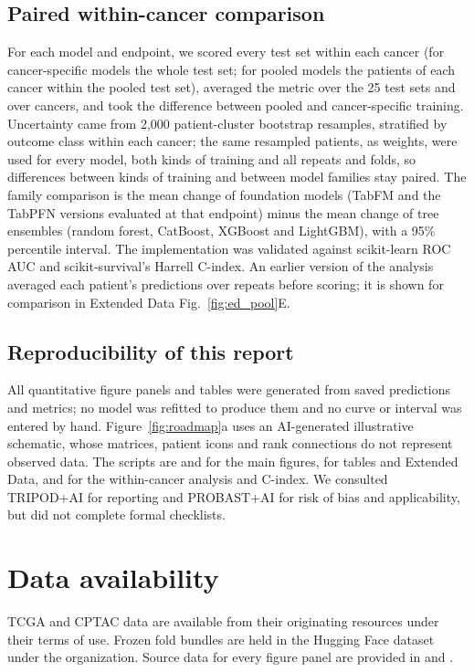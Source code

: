 \documentclass[11pt, a4paper, onecolumn, confidential, copyright]{hawkfranklin}
\begin{document}
\subsection*{Paired within-cancer comparison}
For each model and endpoint, we scored every test set within each cancer (for cancer-specific models the whole test set; for pooled models the patients of each cancer within the pooled test set), averaged the metric over the 25 test sets and over cancers, and took the difference between pooled and cancer-specific training. Uncertainty came from 2,000 patient-cluster bootstrap resamples, stratified by outcome class within each cancer; the same resampled patients, as weights, were used for every model, both kinds of training and all repeats and folds, so differences between kinds of training and between model families stay paired. The family comparison is the mean change of foundation models (TabFM and the TabPFN versions evaluated at that endpoint) minus the mean change of tree ensembles (random forest, CatBoost, XGBoost and LightGBM), with a 95\% percentile interval. The implementation was validated against scikit-learn ROC AUC and scikit-survival's Harrell C-index. An earlier version of the analysis averaged each patient's predictions over repeats before scoring; it is shown for comparison in Extended Data Fig.~\ref{fig:ed_pool}E.

\subsection*{Reproducibility of this report}
All quantitative figure panels and tables were generated from saved predictions and metrics; no model was refitted to produce them and no curve or interval was entered by hand. Figure~\ref{fig:roadmap}a uses an AI-generated illustrative schematic, whose matrices, patient icons and rank connections do not represent observed data. The scripts are  and  for the main figures,  for tables and Extended Data, and  for the within-cancer analysis and C-index. We consulted TRIPOD+AI for reporting and PROBAST+AI for risk of bias and applicability, but did not complete formal checklists.\citep{tripodai2024,probastai2024}

\section*{Data availability}
TCGA and CPTAC data are available from their originating resources under their terms of use. Frozen fold bundles are held in the Hugging Face dataset  under the  organization. Source data for every figure panel are provided in  and .
\end{document}
